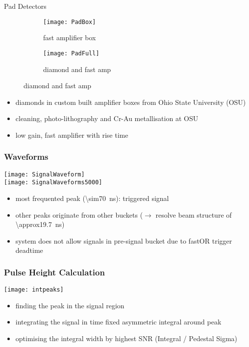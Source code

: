 \begin{frame}{Pad Detectors}

	\begin{figure}[h] 
		\centering
		\begin{subfigure}{0.45\textwidth}  
			\centering
			\texttt{[image: PadBox]}
			\caption{fast amplifier box}
		\end{subfigure}
		\begin{subfigure}{0.45\textwidth} 
			\centering
			\texttt{[image: PadFull]}
			\caption{diamond and fast amp} 	
		\end{subfigure} 
	\end{figure}
	
	\begin{itemize}
		\itemfill
		\item diamonds in custom built amplifier boxes from Ohio State University (OSU)
		\item cleaning, photo-lithography and Cr-Au metallisation at OSU
		\item low gain, fast amplifier with  rise time
	\end{itemize}
	
\end{frame}
\begin{frame}
	\frametitle{Waveforms}
	\vspace*{-20pt}
	\begin{center}
		\texttt{[image: SignalWaveform]}\\
		\texttt{[image: SignalWaveforms5000]}
	\end{center}
	\begin{itemize}
		\item most frequented peak (\SI{\sim70}{ns}): triggered signal
		\item other peaks originate from other buckets ($\rightarrow$ resolve beam structure of \SI{\approx19.7}{ns})
		\item system does not allow signals in pre-signal bucket due to fastOR trigger deadtime
	\end{itemize}
\end{frame}
\begin{frame}
	\frametitle{Pulse Height Calculation}
	\vspace*{-5pt}
	\begin{center}
		\texttt{[image: intpeaks]}\\
	\end{center}
	\vspace*{-5pt}
	\begin{itemize}
		\setlength{\itemsep}{\fill}
		\item finding the peak in the signal region
		\item integrating the signal in time fixed asymmetric integral around peak
		\item optimising the integral width by highest SNR (Integral / Pedestal Sigma)
	\end{itemize}
\end{frame}
